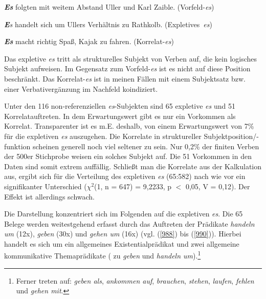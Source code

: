 {\begin{exe}
	\ex\label{985} 
	\textbf{\textit{Es}} folgten mit weitem Abstand Uller und Karl Zaible.
	\hfill\hbox {(Vorfeld-\textit{es})}
\end{exe}
\vspace{-0.65cm}
\begin{exe}
	\ex\label{986} 
	\textit{\textbf{E}s} handelt sich um Ullers Verhältnis zu Rathkolb.
	\hfill\hbox {(Expletives \textit{es})}
\end{exe} 	
\vspace{-0.65cm}
\begin{exe}
	\ex\label{987} 
	\textbf{\textit{Es}} macht richtig Spaß, Kajak zu fahren.
	\hfill\hbox {(Korrelat-\textit{es})}
	\newline
	\hbox{}\hfill\hbox{\citet[324/325/326]{Speyer2009}}
\end{exe} 
Das expletive \textit{es} tritt als strukturelles Subjekt von Verben auf, die kein logisches Subjekt aufweisen. Im Gegensatz zum Vorfeld-\textit{es} ist es nicht auf diese Position beschränkt. Das Korrelat-\textit{es} ist in meinen Fällen mit einem Subjektsatz bzw. einer Verbativergänzung im Nachfeld koindiziert.

Unter den 116 non-referenziellen \textit{es}-Subjekten sind 65 expletive \textit{es} und 51 Korrelatauftreten. In dem Erwartungswert gibt es nur ein Vorkommen als Korrelat. Transparenter ist es m.E. deshalb, von einem Erwartungswert von 7\% für die expletiven \textit{es} auszugehen. Die Korrelate in struktureller Subjektposition/-funktion scheinen generell noch viel seltener zu sein. Nur 0,2\% der finiten Verben der 500er Stichprobe weisen ein solches Subjekt auf. Die 51 Vorkommen in den Daten sind somit extrem auffällig. Schließt man die Korrelate aus der Kalkulation aus, ergibt sich für die Verteilung des expletiven \textit{es} (65:582) nach wie vor ein signifikanter Unterschied ($\chi^{2}$(1, n = 647) = 9,2233, p $<$ 0,05, V = 0,12). Der Effekt ist allerdings schwach.

Die Darstellung konzentriert sich im Folgenden auf die expletiven \textit{es}. Die 65 Belege werden weitestgehend erfasst durch das Auftreten der Prädikate \textit{handeln um} (12x), \textit{geben} (30x) und \textit{gehen um} (16x) (vgl. (\ref{988}) bis (\ref{990})). Hierbei handelt es sich um ein \glqq  allgemeines Existentialprädikat\grqq{} und zwei \glqq allgemeine kommunikative Themaprädikate\grqq{} (\citealt[218]{Askedal1990} zu \textit{geben} und \textit{handeln um}).\footnote{Ferner treten auf: \textit{geben als}, \textit{ankommen auf}, \textit{brauchen}, \textit{stehen}, \textit{laufen}, \textit{fehlen} und \textit{gehen mit}.}

}
